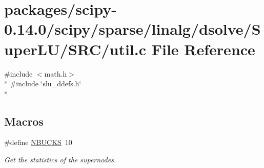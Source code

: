 \hypertarget{scipy-0_814_80_2scipy_2sparse_2linalg_2dsolve_2SuperLU_2SRC_2util_8c}{}\section{packages/scipy-\/0.14.0/scipy/sparse/linalg/dsolve/\+Super\+L\+U/\+S\+R\+C/util.c File Reference}
\label{scipy-0_814_80_2scipy_2sparse_2linalg_2dsolve_2SuperLU_2SRC_2util_8c}
{\ttfamily \#include $<$math.\+h$>$}\\*
{\ttfamily \#include \char`\"{}slu\+\_\+ddefs.\+h\char`\"{}}\\*
\subsection*{Macros}
\begin{DoxyCompactItemize}
\item 
\#define \hyperlink{scipy-0_814_80_2scipy_2sparse_2linalg_2dsolve_2SuperLU_2SRC_2util_8c_a70f31d2c4d8d0802751120e07028bd3a}{N\+B\+U\+C\+K\+S}~10
\begin{DoxyCompactList}\small\item\em Get the statistics of the supernodes. \end{DoxyCompactList}\end{DoxyCompactItemize}
